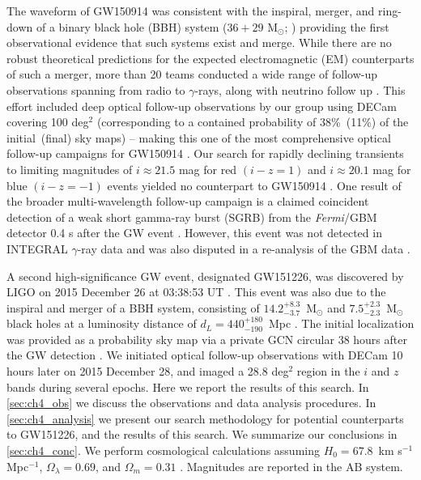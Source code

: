The waveform of GW150914 was consistent with the inspiral, merger,
and ring-down of a binary black hole (BBH) system ($36+29$ M$_\odot$; 
\citealt{LIGOGW150914}) providing the first observational
evidence that such systems exist and merge. While there are no robust
theoretical predictions for the expected electromagnetic (EM)
counterparts of such a merger, more than 20 teams conducted a wide
range of follow-up observations spanning from radio to $\gamma$-rays, along with neutrino follow up
\citep{LIGOGW150914FollowUp,LIGOGW150914FollowUpSupp,GW150914IceCube,Annis+16,GW150914Fermi,Evans+16,Kasliwal+16,Savchenko+16,GW150914PS1,GW150914DECam,Tavani+16}.
This effort included deep optical follow-up observations by our group using DECam covering 100 deg$^2$
(corresponding to a contained probability of 38\%~(11\%) of the initial~(final) sky maps)
-- making this one of the most comprehensive optical 
follow-up campaigns for GW150914 \citep{Annis+16,GW150914DECam}. Our search for rapidly
declining transients to limiting magnitudes of $i\approx21.5$ mag
for red $(i-z=1)$ and $i\approx20.1$ mag for blue $(i-z=-1)$ events yielded no counterpart to
GW150914 \citep{GW150914DECam}. One result of the broader multi-wavelength
follow-up campaign is a claimed coincident detection of a weak short
gamma-ray burst (SGRB) from the {\it Fermi}/GBM detector 0.4 s after
the GW event \citep{GW150914Fermi}. However, this event was not
detected in INTEGRAL $\gamma$-ray data \citep{Savchenko+16} and was also
disputed in a re-analysis of the GBM data \citep{Greiner+16}.

A second high-significance GW event, designated GW151226, was
discovered by LIGO on 2015 December 26 at 03:38:53 UT \citep{LIGOGW151226}. 
This event was also due to the inspiral and merger of a BBH system, consisting 
of $14.2^{+8.3}_{-3.7}$~M$_\odot$ and $7.5^{+2.3}_{-2.3}$~M$_\odot$ black holes at a luminosity 
distance of $d_L = 440^{+180}_{-190}$~Mpc \citep{LIGOGW151226}.
The initial localization was provided as a probability sky map via a private 
GCN circular 38 hours after the GW detection \citep{SingerPrice16}. We initiated
optical follow-up observations with DECam 10 hours later on 2015 December 28,
and imaged a 28.8 deg$^2$ region in the $i$ and $z$ bands during several epochs. Here we report 
the results of this search. In \cref{sec:ch4_obs} we discuss the
observations and data analysis procedures. In \cref{sec:ch4_analysis} 
we present our search methodology for potential counterparts to GW151226, 
and the results of this search. We summarize our conclusions in \cref{sec:ch4_conc}. We perform 
cosmological calculations assuming $H_0 = 67.8$~km  s$^{-1}$ Mpc$^{-1}$,
$\Omega_{\lambda} = 0.69$, and $\Omega_m = 0.31$ \citep{Planck2016}. 
Magnitudes are reported in the AB system. 


